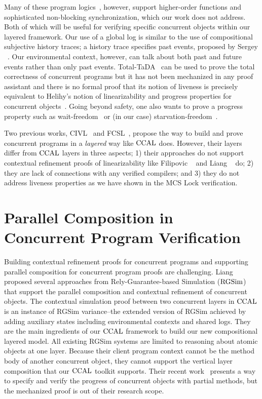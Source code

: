 Many of these program logics~\cite{Turon13popl,iris15}, however, support 
higher-order functions 
and sophisticated non-blocking synchronization,
which our work does not address.
Both of which will be
useful for verifying specific concurrent objects within our layered
framework. 
Our use of a global log is similar to the use of compositional
subjective history traces; a history trace specifies past events, proposed by Sergey \etal~\cite{sergey15}.
Our environmental context, however, can talk about both past and future events rather than only past events.
Total-TaDA~\cite{pinto16} can be used to prove
the total correctness of concurrent programs but it has not been
mechanized in any proof assistant and there is no formal proof that
its notion of liveness is precisely equivalent to Helihy's notion of
linearizability and progress properties for concurrent
objects~\cite{Herlihy08book}. 
Going
beyond safety, one also wants to prove a progress property such as
wait-freedom~\cite{herlihy91:waitfree} or (in our case)
starvation-freedom~\cite{Herlihy08book}.

Two previous works, CIVL~\cite{civl15} and FCSL~\cite{sergey15pldi},
propose the way to build and prove concurrent programs in a \textit{layered} way like $\mathrm{CCAL}$ does. 
However, their layers differ from $\mathrm{CCAL}$ layers in three aspects;
1) their approaches do not support contextual refinement proofs of linearizability like Filipovic \etal~\cite{filipovic10} and Liang \etal~\cite{liang13} do;
2) they are lack of connections with any verified compilers; and
3) they do not address liveness properties as we have shown in the MCS Lock verification.



\section{Parallel Composition in Concurrent Program Verification}
\label{chatper:related:sec:parallel-composition-in-concurrent-program-verification}

Building contextual refinement proofs for concurrent programs and supporting parallel composition for concurrent program proofs 
are challenging.
Liang \etal~\cite{RGSim,Liang14lics,lili16, liang:2017} 
proposed several approaches from Rely-Guarantee-based Simulation ($\mathrm{RGSim}$) 
that support the parallel
composition and  contextual refinement of concurrent
objects.
The contextual simulation proof between two concurrent layers in $\mathrm{CCAL}$ is an instance of RGSim variance--the extended version of RGSim achieved by adding auxiliary states including environmental contexts and shared logs. 
They are the main ingredients of our $\mathrm{CCAL}$ framework 
to build our new  compositional
layered model.
All existing RGSim systems are limited to reasoning
about atomic objects at one layer.
Because their client program context cannot 
be the method body of another concurrent object, 
they cannot
support the vertical layer composition that our $\mathrm{CCAL}$ toolkit supports.
Their recent work~\cite{liang:2017} presents a way to specify and verify the progress of concurrent objects with partial methods, but the mechanized proof is out of their research scope. 


